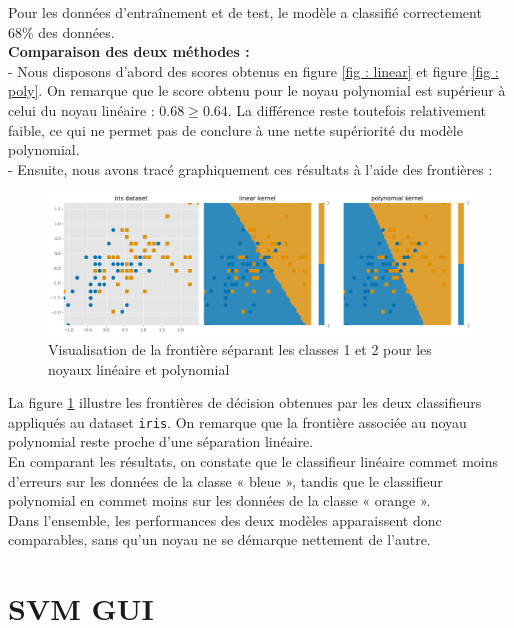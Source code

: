 \documentclass[a4paper,12pt]{article}
\begin{document}
Pour les données d'entraînement et de test, le modèle a classifié correctement 68\% des données. \\

\textbf{Comparaison des deux méthodes  : }\\[0.5cm]
- Nous disposons d'abord des scores obtenus en figure \ref{fig : linear} et figure \ref{fig : poly}.
On remarque que le score obtenu pour le noyau polynomial est supérieur à celui du noyau linéaire : $0.68 \geq 0.64$.
La différence reste toutefois relativement faible, ce qui ne permet pas de conclure à une nette supériorité du modèle polynomial.\\

- Ensuite, nous avons tracé graphiquement ces résultats à l'aide des frontières : \\
\begin{figure}[H]
    \centering
    \includegraphics[width=\textwidth]{Images/linear_vs_poly.png}
    \caption{Visualisation de la frontière séparant les classes 1 et 2 pour les noyaux linéaire et polynomial}\label{fig : compare}
\end{figure}

La figure \ref{fig : compare} illustre les frontières de décision obtenues par les deux classifieurs appliqués au dataset \texttt{iris}.  
On remarque que la frontière associée au noyau polynomial reste proche d’une séparation linéaire. \\
En comparant les résultats, on constate que le classifieur linéaire commet moins d’erreurs sur les données de la classe « bleue », tandis que le classifieur polynomial en commet moins sur les données de la classe « orange ».  \\
Dans l’ensemble, les performances des deux modèles apparaissent donc comparables, sans qu’un noyau ne se démarque nettement de l’autre.

\newpage

\section{SVM GUI}
\end{document}
